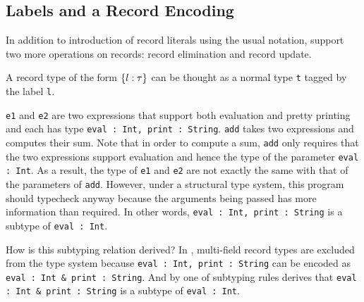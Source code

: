 {\subsection{Labels and a Record Encoding}

In addition to introduction of record literals using the usual
notation, \name support two more operations on records: record
elimination and record update.

A record type of the form $ \{ l : \tau \} $ can be thought as a normal type \lstinline{t}
tagged by the label \lstinline{l}.



\lstinline{e1} and \lstinline{e2} are two expressions that support both evaluation and pretty
printing and each has type \lstinline{eval : Int, print : String}. \lstinline{add} takes
two expressions and computes their sum. Note that in order to compute a sum,
\lstinline{add} only requires that the two expressions support evaluation and hence the
type of the parameter \lstinline{eval : Int}. As a result, the type of \lstinline{e1} and
\lstinline{e2} are not exactly the same with that of the parameters of \lstinline{add}. However,
under a structural type system, this program should typecheck anyway because the
arguments being passed has more information than required. In other words,
\lstinline{eval : Int, print : String} is a subtype of \lstinline{eval : Int}.

How is this subtyping relation derived? In \name, multi-field record types are
excluded from the type system because \lstinline{eval : Int, print : String} can
be encoded as \lstinline{eval : Int & print : String}. And by one of
subtyping rules derives that \lstinline{eval : Int & print : String} is a
subtype of \lstinline{eval : Int}.



}
